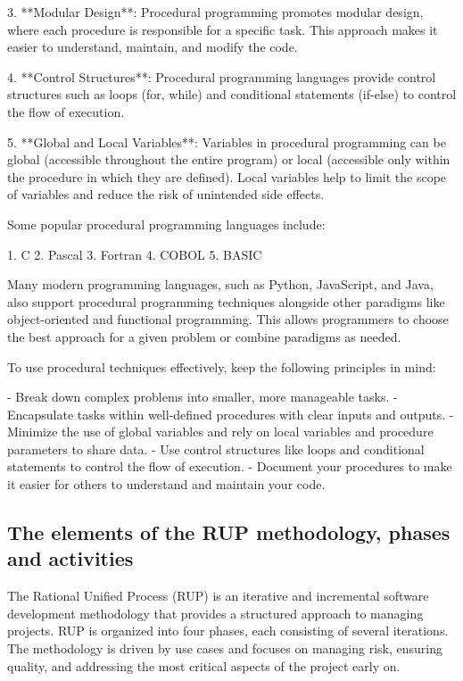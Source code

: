 \documentclass{article}
\begin{document}
3. **Modular Design**: Procedural programming promotes modular design, where each procedure is responsible for a specific task. This approach makes it easier to understand, maintain, and modify the code.

4. **Control Structures**: Procedural programming languages provide control structures such as loops (for, while) and conditional statements (if-else) to control the flow of execution.

5. **Global and Local Variables**: Variables in procedural programming can be global (accessible throughout the entire program) or local (accessible only within the procedure in which they are defined). Local variables help to limit the scope of variables and reduce the risk of unintended side effects.

Some popular procedural programming languages include:

1. C
2. Pascal
3. Fortran
4. COBOL
5. BASIC

Many modern programming languages, such as Python, JavaScript, and Java, also support procedural programming techniques alongside other paradigms like object-oriented and functional programming. This allows programmers to choose the best approach for a given problem or combine paradigms as needed.

To use procedural techniques effectively, keep the following principles in mind:

- Break down complex problems into smaller, more manageable tasks.
- Encapsulate tasks within well-defined procedures with clear inputs and outputs.
- Minimize the use of global variables and rely on local variables and procedure parameters to share data.
- Use control structures like loops and conditional statements to control the flow of execution.
- Document your procedures to make it easier for others to understand and maintain your code.


\subsection{The elements of the RUP methodology, phases and activities}

The Rational Unified Process (RUP) is an iterative and incremental software development methodology that provides a structured approach to managing projects. RUP is organized into four phases, each consisting of several iterations. The methodology is driven by use cases and focuses on managing risk, ensuring quality, and addressing the most critical aspects of the project early on.
\end{document}
